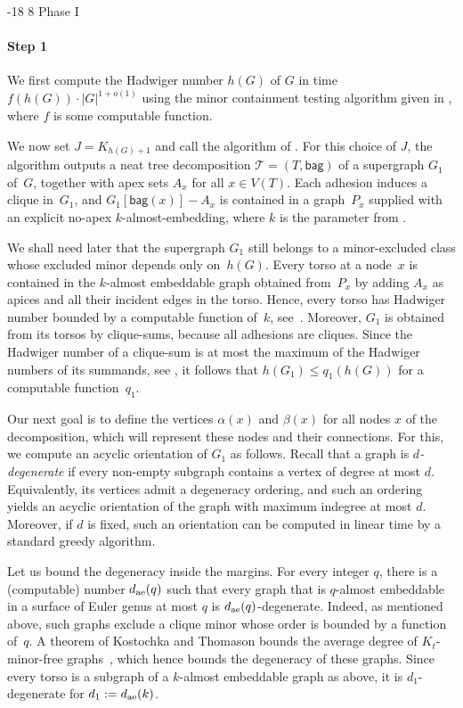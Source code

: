 \documentclass[1p,number,11pt]{elsarticle}
\makeatletter
\renewcommand\subsection{\@startsection{subsection}{2}{\z@}%
  {-18\p@ \@plus -4\p@ \@minus -4\p@}%
  {8\p@ \@plus 4\p@ \@minus 4\p@}%
  {\normalfont\normalsize\bfseries}}
\theoremstyle{plain}
\newcommand{\bag}{\mathsf{bag}}
\renewcommand{\leq}{\leqslant}
\makeatother
\begin{document}
\subsection{Phase I}
\paragraph{Step 1}
We first compute the Hadwiger number $h(G)$ of $G$ in time $f(h(G))\cdot|G|^{1+o(1)}$ using the minor containment testing algorithm given in \cite{korhonen2024minor}, where $f$ is some computable function.

We now set $J=K_{h(G)+1}$ and call the algorithm of .
For this choice of $J$, the algorithm outputs a neat tree decomposition
$\mathcal T=(T,\bag)$ of a supergraph $G_1$ of~$G$, together with apex sets
$A_x$ for all $x\in V(T)$. Each adhesion induces a clique in~$G_1$, and
$G_1[\bag(x)]-A_x$ is contained in a graph~$P_x$ supplied with an explicit
no-apex $k$-almost-embedding, where $k$ is the parameter from
.

We shall need later that the supergraph $G_1$ still belongs to a
minor-excluded class whose excluded minor depends only on~$h(G)$.
Every torso at a node~$x$ is contained in the $k$-almost embeddable graph
obtained from~$P_x$ by adding $A_x$ as apices and all their incident edges
in the torso. Hence, every torso has Hadwiger number bounded by a computable
function of~$k$, see~\cite[Theorem~3.1]{JoretWood2013}.
Moreover, $G_1$ is obtained from its torsos by clique-sums, because all
adhesions are cliques. Since the Hadwiger number of a clique-sum is at most
the maximum of the Hadwiger numbers of its summands, see
\cite[Lemma~2.3]{JoretWood2013}, it follows that
$h(G_1)\leq q_1(h(G))$ for a computable function~$q_1$.

Our next goal is to define the vertices $\alpha(x)$ and $\beta(x)$ for all nodes $x$ of the decomposition, which will represent these nodes and their connections. 
For this, we compute an acyclic orientation of $G_1$ as follows. 
Recall that a graph is \emph{$d$-degenerate} if every non-empty subgraph contains a vertex of degree at most $d$. 
Equivalently, its vertices admit a degeneracy ordering, and such an ordering yields an acyclic orientation of the graph with maximum indegree at most $d$.  
Moreover, if $d$ is fixed, such an orientation can be computed in linear time by a standard greedy algorithm.

Let us bound the degeneracy inside the margins.
For every integer $q$, there is a (computable) number $d_{\rm ae}(q)$ such that every graph that is $q$-almost embeddable in a surface of Euler genus at most $q$ is $d_{\rm ae}(q)$-degenerate.
Indeed, as mentioned above, such graphs exclude a clique minor whose order is bounded by a function of~$q$. 
A theorem of Kostochka and Thomason bounds the average degree of
$K_t$-minor-free graphs~\cite{Th2}, which hence bounds the degeneracy of these graphs.
Since every torso is a subgraph of a $k$-almost embeddable graph as above,
it is $d_1$-degenerate for $d_1:=d_{\rm ae}(k)$.
\end{document}
